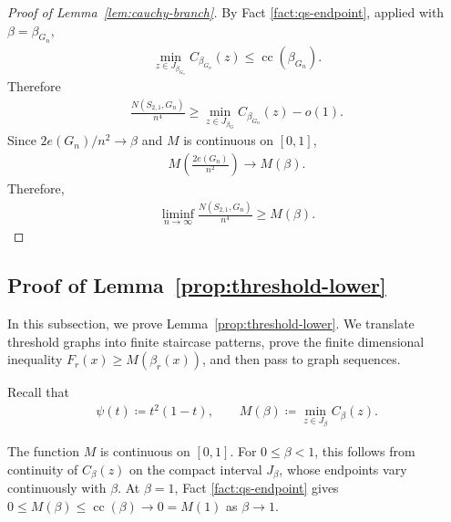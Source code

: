 \documentclass[10pt,a4paper]{article}
\newcommand{\cc}{\operatorname{cc}}
\begin{document}
\begin{proof}[Proof of Lemma~\ref{lem:cauchy-branch}]
By Fact \ref{fact:qs-endpoint}, applied with $\beta=\beta_{G_n}$,
\begin{align*}
  \min_{z\in J_{\beta_{G_n}}} C_{\beta_{G_n}}(z)\le \cc(\beta_{G_n}).
\end{align*}
Therefore
\begin{align*}
  \frac{N(S_{2,1},G_n)}{n^4}\ge \min_{z\in J_{\beta_G}} C_{\beta_{G_n}}(z)-o(1).
\end{align*}
 Since $2e(G_n)/n^2 \to\beta $ and $M$ is continuous on $ [0,1]$,
 \begin{align*}
     M\left(\frac{2e(G_n)}{n^2}\right)\to M(\beta). 
 \end{align*}
 Therefore,
 \begin{align*}
     \liminf_{n\to\infty}\frac{N(S_{2,1},G_n)}{n^4}\ge M(\beta).
 \end{align*}
\end{proof}


\subsection{Proof of Lemma~\ref{prop:threshold-lower}}\label{subsec:prove-lemma4.3}
In this subsection, we prove Lemma~\ref{prop:threshold-lower}. 
We translate threshold graphs into finite 
staircase patterns, prove the finite dimensional inequality $F_r(x)\ge 
M(\beta_r(x))$, and then pass to graph 
sequences.

Recall that
\begin{align*}
  \psi(t)\coloneqq t^2(1-t),
  \qquad
  M(\beta)\coloneqq\min_{z\in J_\beta}C_\beta(z).
\end{align*}

The function $M$ is continuous on $[0,1]$.  For $0\le\beta<1$, this follows from continuity of $C_\beta(z)$ on the compact interval $J_\beta$, whose endpoints vary continuously with $\beta$.  At $\beta=1$, Fact \ref{fact:qs-endpoint} gives $0\le M(\beta)\le\cc(\beta)\to0=M(1)$ as $\beta\to1$.
\end{document}

